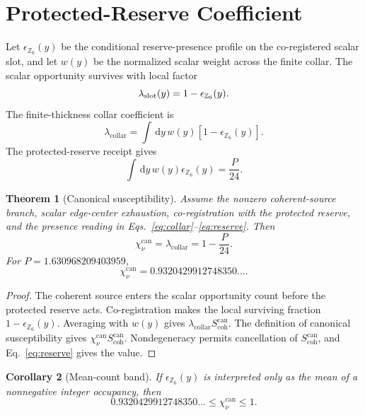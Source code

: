 \documentclass[11pt]{article}
\numberwithin{equation}{section}
\newtheorem{theorem}{Theorem}[section]
\newtheorem{corollary}[theorem]{Corollary}
\theoremstyle{remark}
\newcommand{\chican}{\chi_\nu^{\mathrm{can}}}
\newcommand{\scohcan}{S_{\mathrm{coh}}^{\mathrm{can}}}
\newcommand{\lambdac}{\lambda_{\mathrm{collar}}}
\newcommand{\dd}{\,\mathrm d}
\begin{document}
\section{Protected-Reserve Coefficient}

Let \(\epsilon_{\mathbb Z_6}(y)\) be the conditional reserve-presence profile
on the co-registered scalar slot, and let \(w(y)\) be the normalized scalar
weight across the finite collar. The scalar opportunity survives with local
factor
\begin{equation}
\lambda_{\rm slot}(y)=1-\epsilon_{\mathbb Z_6}(y).
\end{equation}
The finite-thickness collar coefficient is
\begin{equation}
\lambdac=\int\dd y\,w(y)
\left[1-\epsilon_{\mathbb Z_6}(y)\right].
\label{eq:collar}
\end{equation}
The protected-reserve receipt gives
\begin{equation}
\int\dd y\,w(y)\epsilon_{\mathbb Z_6}(y)=\frac{P}{24}.
\label{eq:reserve}
\end{equation}

\begin{theorem}[Canonical susceptibility]
Assume the nonzero coherent-source branch, scalar edge-center exhaustion,
co-registration with the protected reserve, and the presence reading in
Eqs.~\eqref{eq:collar}--\eqref{eq:reserve}. Then
\begin{equation}
\boxed{\chican=\lambdac=1-\frac{P}{24}}.
\label{eq:canonical}
\end{equation}
For \(P=1.630968209403959\),
\begin{equation}
\boxed{\chican=0.9320429912748350\ldots}.
\label{eq:value}
\end{equation}
\end{theorem}

\begin{proof}
The coherent source enters the scalar opportunity count before the protected
reserve acts. Co-registration makes the local surviving fraction
\(1-\epsilon_{\mathbb Z_6}(y)\). Averaging with \(w(y)\) gives
\(\lambdac\scohcan\). The definition of canonical susceptibility gives
\(\chican\scohcan\). Nondegeneracy permits cancellation of \(\scohcan\), and
Eq.~\eqref{eq:reserve} gives the value.
\end{proof}

\begin{corollary}[Mean-count band]
If \(\epsilon_{\mathbb Z_6}(y)\) is interpreted only as the mean of a
nonnegative integer occupancy, then
\begin{equation}
\boxed{0.9320429912748350\ldots\le\chican\le1}.
\label{eq:band}
\end{equation}
\end{corollary}
\end{document}
